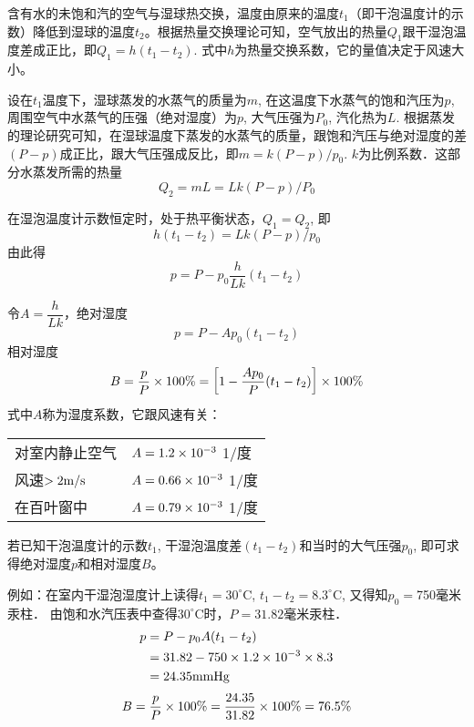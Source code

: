 含有水的未饱和汽的空气与湿球热交换，温度由原来的温度$t_1$（即干泡温度计的示数）降低到湿球的温度$t_2$。根据热量交换理论可知，空气放出的热量$Q_1$跟干湿泡温度差成正比，即$Q_1=h(t_1-t_2)$. 式中$h$为热量交换系数，它的量值决定于风速大小。

设在$t_1$温度下，湿球蒸发的水蒸气的质量为$m$, 在这温度下水蒸气的饱和汽压为$p$, 周围空气中水蒸气的压强（绝对湿度）为$p$, 大气压强为$P_0$, 汽化热为$L$. 根据蒸发的理论研究可知，在湿球温度下蒸发的水蒸气的质量，跟饱和汽压与绝对湿度的差$(P-p)$成正比，跟大气压强成反比，即$m=k(P-p)/p_0$. $k$为比例系数．这部分水蒸发所需的热量
\[Q_2=mL=Lk (P-p) /P_0\]

在湿泡温度计示数恒定时，处于热平衡状态，$Q_1=Q_2$, 即
\[h (t_1-t_2) =Lk (P-p) /p_0\]
由此得
\[p=P-p_0 \frac{h}{Lk} (t_1-t_2) \]

令$A=\dfrac{h}{Lk}$，绝对湿度
\[p=P-Ap_0(t_1-t_2)\]
相对湿度
\[B=\frac{p}{P}\times 100\%=\left[1-\frac{Ap_0}{P}(t_1-t_2)\right]\times 100\%\]
式中$A$称为湿度系数，它跟风速有关：
\begin{center}
  \begin{tabular}{p{}l}
    对室内静止空气& $A=1.2\times10^{-3}$ 1/度\\
风速$>2{\rm m/s}$& $A=0.66\times10^{-3}$ 1/度\\
在百叶窗中&  $A=0.79\times10^{-3}$ 1/度
  \end{tabular}
\end{center}

若已知干泡温度计的示数$t_1$, 干湿泡温度差$(t_1-t_2)$和当时的大气压强$p_0$, 即可求得绝对湿度$p$和相对湿度$B$。

例如：在室内干湿泡湿度计上读得$t_1=30^{\circ}$C, $t_1-t_2=8.3^{\circ}$C, 又得知$p_0=$750毫米汞柱．
由饱和水汽压表中查得$30^{\circ}$C时，$P=31.82$毫米汞柱．
\[\begin{split}
  p&=P-p_0A(t_1-t_2)\\
  &=31.82-750\times 1.2\times 10^{-3}\times 8.3\\
  &=24.35{\rm mmHg}
\end{split}\]
\[B=\frac{p}{P}\times100\%=\frac{24.35}{31.82}\times100\%=76.5\%\]


